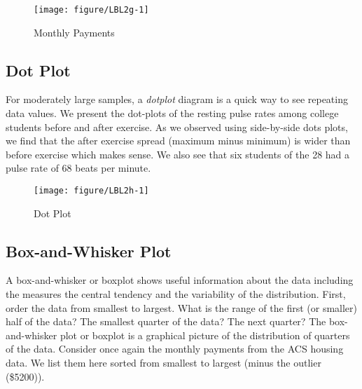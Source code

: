 \documentclass[11pt]{book}\usepackage[]{graphicx}\usepackage[]{color}
\begin{document}

\begin{figure}[ht]

\caption{Monthly Payments }



{\centering \texttt{[image: figure/LBL2g-1]} 

}




\end{figure}

\subsection{Dot Plot}

For moderately large samples, a \textit{dotplot} diagram is a quick way to see repeating data values.  We present the dot-plots of the resting pulse rates among college students before and after exercise.  As we observed using side-by-side dots plots, we find that the after exercise spread (maximum minus minimum) is wider than before exercise which makes sense.  We also see that six students of the 28 had a pulse rate of 68 beats per minute.

\begin{figure}[ht]

\caption{Dot Plot }



{\centering \texttt{[image: figure/LBL2h-1]} 

}




\end{figure}

\newpage

\subsection{Box-and-Whisker Plot}

A box-and-whisker or boxplot shows useful information about the data including the measures the central tendency and the variability of the distribution.  First, order the data from smallest to largest.  What is the range of the first (or smaller) half of the data?  The smallest quarter of the data?  The next quarter?  The box-and-whisker plot or boxplot is a graphical picture of the distribution of quarters of the data.  Consider once again the monthly payments from the ACS housing data.  We list them here sorted from smallest to largest (minus the outlier  (\$5200)).
\end{document}

